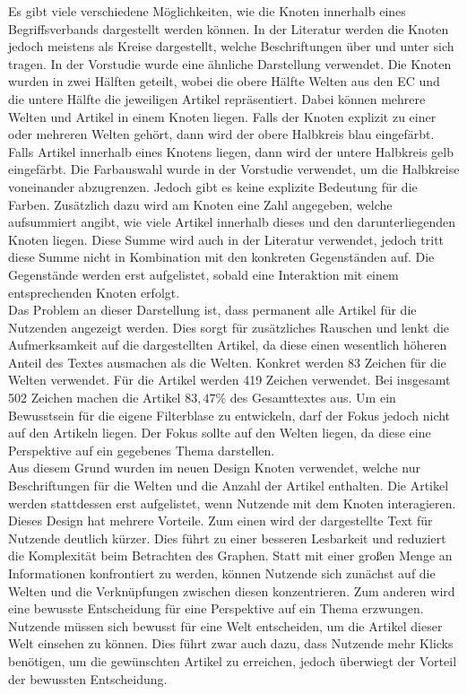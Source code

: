 Es gibt viele verschiedene Möglichkeiten, wie die Knoten innerhalb eines Begriffsverbands dargestellt werden können.
In der Literatur werden die Knoten jedoch meistens als Kreise dargestellt, welche Beschriftungen über und unter sich tragen.
In der Vorstudie wurde eine ähnliche Darstellung verwendet.
Die Knoten wurden in zwei Hälften geteilt, wobei die obere Hälfte Welten aus den \ac{EC} und die untere Hälfte die jeweiligen Artikel repräsentiert.
Dabei können mehrere Welten und Artikel in einem Knoten liegen.
Falls der Knoten explizit zu einer oder mehreren Welten gehört, dann wird der obere Halbkreis blau eingefärbt.
Falls Artikel innerhalb eines Knotens liegen, dann wird der untere Halbkreis gelb eingefärbt.
Die Farbauswahl wurde in der Vorstudie verwendet, um die Halbkreise voneinander abzugrenzen.
Jedoch gibt es keine explizite Bedeutung für die Farben.
Zusätzlich dazu wird am Knoten eine Zahl angegeben, welche aufsummiert angibt, wie viele Artikel innerhalb dieses und den darunterliegenden Knoten liegen.
Diese Summe wird auch in der Literatur verwendet, jedoch tritt diese Summe nicht in Kombination mit den konkreten Gegenständen auf.
Die Gegenstände werden erst aufgelistet, sobald eine Interaktion mit einem entsprechenden Knoten erfolgt. \\

Das Problem an dieser Darstellung ist, dass permanent alle Artikel für die Nutzenden angezeigt werden.
Dies sorgt für zusätzliches Rauschen und lenkt die Aufmerksamkeit auf die dargestellten Artikel, da diese einen wesentlich höheren Anteil des Textes ausmachen als die Welten.
Konkret werden 83 Zeichen für die Welten verwendet.
Für die Artikel werden 419 Zeichen verwendet.
Bei insgesamt 502 Zeichen machen die Artikel $83,47\%$ des Gesamttextes aus.
Um ein Bewusstsein für die eigene Filterblase zu entwickeln, darf der Fokus jedoch nicht auf den Artikeln liegen.
Der Fokus sollte auf den Welten liegen, da diese eine Perspektive auf ein gegebenes Thema darstellen.\\

Aus diesem Grund wurden im neuen Design Knoten verwendet, welche nur Beschriftungen für die Welten und die Anzahl der Artikel enthalten.
Die Artikel werden stattdessen erst aufgelistet, wenn Nutzende mit dem Knoten interagieren.
Dieses Design hat mehrere Vorteile.
Zum einen wird der dargestellte Text für Nutzende deutlich kürzer.
Dies führt zu einer besseren Lesbarkeit und reduziert die Komplexität beim Betrachten des Graphen.
Statt mit einer großen Menge an Informationen konfrontiert zu werden, können Nutzende sich zunächst auf die Welten und die Verknüpfungen zwischen diesen konzentrieren.
Zum anderen wird eine bewusste Entscheidung für eine Perspektive auf ein Thema erzwungen.
Nutzende müssen sich bewusst für eine Welt entscheiden, um die Artikel dieser Welt einsehen zu können.
Dies führt zwar auch dazu, dass Nutzende mehr Klicks benötigen, um die gewünschten Artikel zu erreichen, jedoch überwiegt der Vorteil der bewussten Entscheidung.\\


